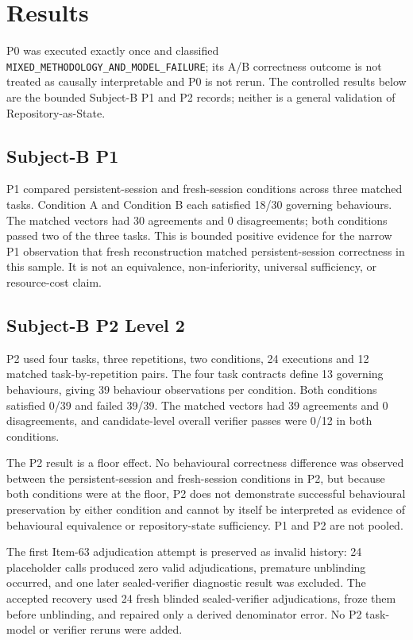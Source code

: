\section{Results}
\label{sec:results}

P0 was executed exactly once and classified \texttt{MIXED\_METHODOLOGY\_AND\_MODEL\_FAILURE}; its A/B correctness outcome is not treated as causally interpretable and P0 is not rerun. The controlled results below are the bounded Subject-B P1 and P2 records; neither is a general validation of Repository-as-State.

\subsection{Subject-B P1}

P1 compared persistent-session and fresh-session conditions across three matched tasks. Condition A and Condition B each satisfied 18/30 governing behaviours. The matched vectors had 30 agreements and 0 disagreements; both conditions passed two of the three tasks. This is bounded positive evidence for the narrow P1 observation that fresh reconstruction matched persistent-session correctness in this sample. It is not an equivalence, non-inferiority, universal sufficiency, or resource-cost claim.

\subsection{Subject-B P2 Level 2}

P2 used four tasks, three repetitions, two conditions, 24 executions and 12 matched task-by-repetition pairs. The four task contracts define 13 governing behaviours, giving 39 behaviour observations per condition. Both conditions satisfied 0/39 and failed 39/39. The matched vectors had 39 agreements and 0 disagreements, and candidate-level overall verifier passes were 0/12 in both conditions.

The P2 result is a floor effect. No behavioural correctness difference was observed between the persistent-session and fresh-session conditions in P2, but because both conditions were at the floor, P2 does not demonstrate successful behavioural preservation by either condition and cannot by itself be interpreted as evidence of behavioural equivalence or repository-state sufficiency. P1 and P2 are not pooled.

The first Item-63 adjudication attempt is preserved as invalid history: 24 placeholder calls produced zero valid adjudications, premature unblinding occurred, and one later sealed-verifier diagnostic result was excluded. The accepted recovery used 24 fresh blinded sealed-verifier adjudications, froze them before unblinding, and repaired only a derived denominator error. No P2 task-model or verifier reruns were added.

